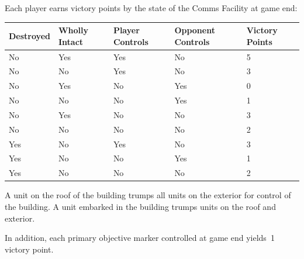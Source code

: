 \begin{scoring}  
\begin{primaries}

  Each player earns victory points by the state of the Comms Facility
  at game end:

\begin{center}  
  \begin{tabular}{C{1in}C{1in}C{1in}C{1in}C{1in}}
{\bf Destroyed} & {\bf Wholly Intact} & {\bf Player Controls} & {\bf Opponent Controls} & {\bf Victory Points}\\
\hline
No & Yes & Yes & No  & 5\\
 No & No  & Yes & No  & 3\\
No & Yes & No  & Yes & 0\\
 No & No  & No  & Yes & 1\\
No & Yes & No  & No  & 3\\
 No & No  & No  & No  & 2\\
Yes & No & Yes & No  & 3\\
 Yes & No & No  & Yes & 1\\
Yes & No & No  & No  & 2\\
  \end{tabular}
\end{center}

A unit on the roof of the building trumps all units on the exterior
for control of the building.  A unit embarked in the building trumps
units on the roof and exterior.

In addition, each primary objective marker controlled at game end
yields~1 victory point.


\end{primaries}
\end{scoring}

